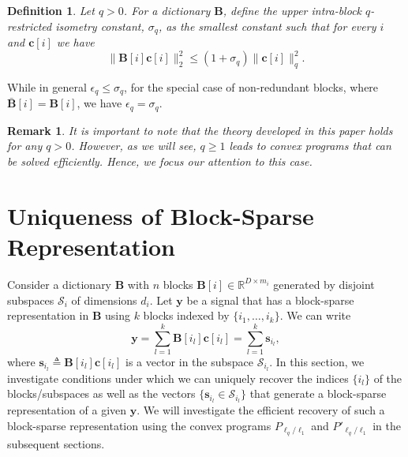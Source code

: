 \documentclass[10pt,twocolumn,twoside] {IEEEtran}
\newtheorem{definition}{Definition}
\newtheorem{remark}{Remark}
\begin{document}
{\vspace{1mm}
\begin{definition}
\label{def:genRIP2}
Let $q > 0$. For a dictionary ${\boldsymbol{B}}$, define the \emph{upper intra-block $q$-restricted isometry constant}, $\sigma_q$, as the smallest constant such that for every $i$ and ${\boldsymbol{c}}[i]$ we have
\begin{equation}
\label{eq:Delta}
\| {\boldsymbol{B}}[i] {\boldsymbol{c}}[i] \|_2^2 \leq (1+\sigma_q) \| {\boldsymbol{c}}[i] \|_q^2.
\end{equation}
\end{definition}
\vspace{1mm}
While in general $\epsilon_q \leq \sigma_q$, for the special case of non-redundant blocks, where $\bar{\boldsymbol{B}}[i] = {\boldsymbol{B}}[i]$, we have $\epsilon_q = \sigma_q$. 
\vspace{1mm}
\begin{remark}
It is important to note that the theory developed in this paper holds for any $q > 0$. However, as we will see, $q \geq 1$ leads to convex programs that can be solved efficiently. Hence, we focus our attention to this case.
\end{remark}

\section{Uniqueness of Block-Sparse Representation}
\label{sec:uniqueness} 
Consider a dictionary ${\boldsymbol{B}}$ with $n$ blocks ${\boldsymbol{B}}[i] \in {\mathbb{R}}^{D \times m_i}$ generated by disjoint subspaces ${\mathcal{S}}_i$ of dimensions $d_i$. Let ${\boldsymbol{y}}$ be a signal that has a block-sparse representation in ${\boldsymbol{B}}$ using $k$ blocks indexed by $\{i_1, \ldots, i_k\}$. We can write
\begin{equation}
{\boldsymbol{y}} = \sum_{l=1}^{k}{{\boldsymbol{B}}[i_l] {\boldsymbol{c}}[i_l]} = \sum_{l=1}^{k}{{\boldsymbol{s}}_{i_l}},
\end{equation}
where ${\boldsymbol{s}}_{i_l} \triangleq {\boldsymbol{B}}[i_l] {\boldsymbol{c}}[i_l]$ is a vector in the subspace ${\mathcal{S}}_{i_l}$. In this section, we investigate conditions under which we can uniquely recover the indices $\{i_l\}$ of the blocks/subspaces as well as the vectors $\{ {\boldsymbol{s}}_{i_l} \in {\mathcal{S}}_{i_l} \}$ that generate a block-sparse representation of a given ${\boldsymbol{y}}$. We will investigate the efficient recovery of such a block-sparse representation using the convex programs $P_{\ell_q/\ell_1}$ and $P'_{\ell_q/\ell_1}$ in the subsequent sections.

}
\end{document}

